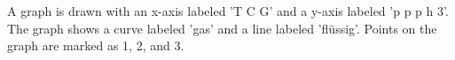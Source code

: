 A graph is drawn with an x-axis labeled 'T C G' and a y-axis labeled 'p p p h 3'. The graph shows a curve labeled 'gas' and a line labeled 'flüssig'. Points on the graph are marked as 1, 2, and 3.